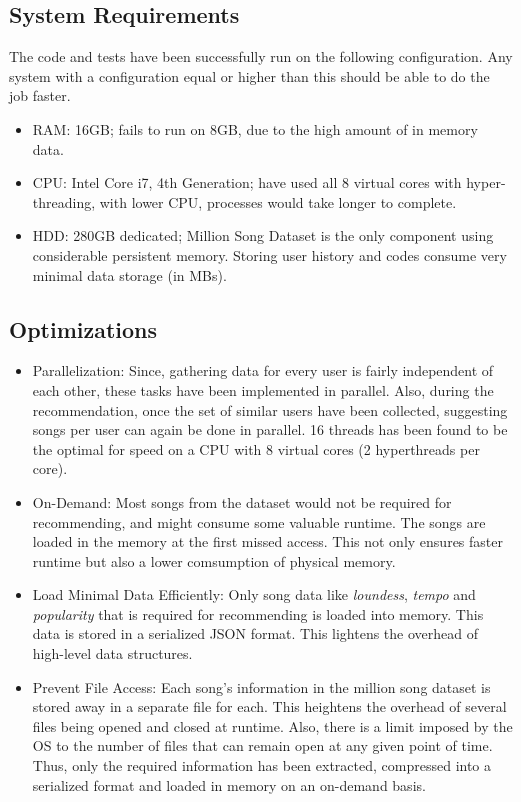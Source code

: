 		\subsection{System Requirements}
		The code and tests have been successfully run on the following configuration. Any system with a configuration equal or higher than this should be able to do the job faster.
\begin{itemize}
	\item RAM: 16GB; fails to run on 8GB, due to the high amount of in memory data.
	\item CPU: Intel Core i7, 4th Generation; have used all 8 virtual cores with hyper-threading, with lower CPU, processes would take longer to complete.
	\item HDD: 280GB dedicated; Million Song Dataset is the only component using considerable persistent memory. Storing user history and codes consume very minimal data storage (in MBs).
\end{itemize}
		
		\subsection{Optimizations}
\begin{itemize}
	\item Parallelization: Since, gathering data for every user is fairly independent of each other, these tasks have been implemented in parallel. Also, during the recommendation, once the set of similar users have been collected, suggesting songs per user can again be done in parallel. 16 threads has been found to be the optimal for speed on a CPU with 8 virtual cores (2 hyperthreads per core).
	\item On-Demand: Most songs from the dataset would not be required for recommending, and might consume some valuable runtime. The songs are loaded in the memory at the first missed access. This not only ensures faster runtime but also a lower comsumption of physical memory.
	\item Load Minimal Data Efficiently: Only song data like \emph{loundess}, \emph{tempo} and \emph{popularity} that is required for recommending is loaded into memory. This data is stored in a serialized JSON format. This lightens the overhead of high-level data structures.
	\item Prevent File Access: Each song's information in the million song dataset is stored away in a separate file for each. This heightens the overhead of several files being opened and closed at runtime. Also, there is a limit imposed by the OS to the number of files that can remain open at any given point of time. Thus, only the required information has been extracted, compressed into a serialized format and loaded in memory on an on-demand basis.
\end{itemize}
	
